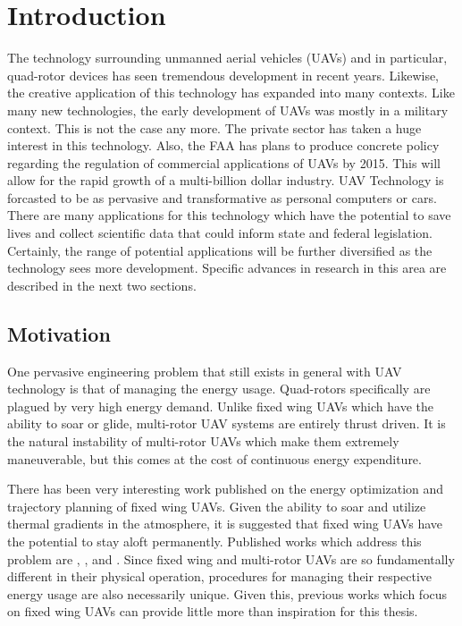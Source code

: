 
\chapter{Introduction} %

\label{Introduction} %



The technology surrounding unmanned aerial vehicles (UAVs) and in particular, quad-rotor devices has seen tremendous development in recent years. Likewise, the creative application of this technology has expanded into many contexts. Like many new technologies, the early development of UAVs was mostly in a military context. This is not the case any more. The private sector has taken a huge interest in this technology. Also, the FAA has plans to produce concrete policy regarding the regulation of commercial applications of UAVs by 2015. This will allow for the rapid growth of a multi-billion dollar industry. UAV Technology is forcasted to be as pervasive and transformative as personal computers or cars. There are many applications for this technology which have the potential to save lives and collect scientific data that could inform state and federal legislation. Certainly, the range of potential applications will be further diversified as the technology sees more development. Specific advances in research in this area are described in the next two sections.


\section{Motivation}

One pervasive engineering problem that still exists in general with UAV technology is that of managing the energy usage. Quad-rotors specifically are plagued by very high energy demand. Unlike fixed wing UAVs which have the ability to soar or glide, multi-rotor UAV systems are entirely thrust driven. It is the natural instability of multi-rotor UAVs which make them extremely maneuverable, but this comes at the cost of continuous energy expenditure.

There has been very interesting work published on the energy optimization and trajectory planning of fixed wing UAVs. Given the ability to soar and utilize thermal gradients in the atmosphere, it is suggested that fixed wing UAVs have the potential to stay aloft permanently. Published works which address this problem are \cite{langelaan2007long}, \cite{klesh2009solar}, and \cite{lawrance2009guidance}. Since fixed wing and multi-rotor UAVs are so fundamentally different in their physical operation, procedures for managing their respective energy usage are also necessarily unique. Given this, previous works which focus on fixed wing UAVs can provide little more than inspiration for this thesis.



